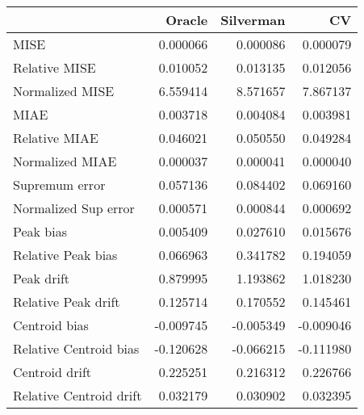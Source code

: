 \begin{tabular}{lrrr}
  \toprule
 & Oracle & Silverman & CV \\ 
  \midrule
MISE & 0.000066 & 0.000086 & 0.000079 \\ 
  Relative MISE & 0.010052 & 0.013135 & 0.012056 \\ 
  Normalized MISE & 6.559414 & 8.571657 & 7.867137 \\ 
  MIAE & 0.003718 & 0.004084 & 0.003981 \\ 
  Relative MIAE & 0.046021 & 0.050550 & 0.049284 \\ 
  Normalized MIAE & 0.000037 & 0.000041 & 0.000040 \\ 
  Supremum error & 0.057136 & 0.084402 & 0.069160 \\ 
  Normalized Sup error & 0.000571 & 0.000844 & 0.000692 \\ 
  Peak bias & 0.005409 & 0.027610 & 0.015676 \\ 
  Relative Peak bias & 0.066963 & 0.341782 & 0.194059 \\ 
  Peak drift & 0.879995 & 1.193862 & 1.018230 \\ 
  Relative Peak drift & 0.125714 & 0.170552 & 0.145461 \\ 
  Centroid bias & -0.009745 & -0.005349 & -0.009046 \\ 
  Relative Centroid bias & -0.120628 & -0.066215 & -0.111980 \\ 
  Centroid drift & 0.225251 & 0.216312 & 0.226766 \\ 
  Relative Centroid drift & 0.032179 & 0.030902 & 0.032395 \\ 
   \bottomrule
\end{tabular}
